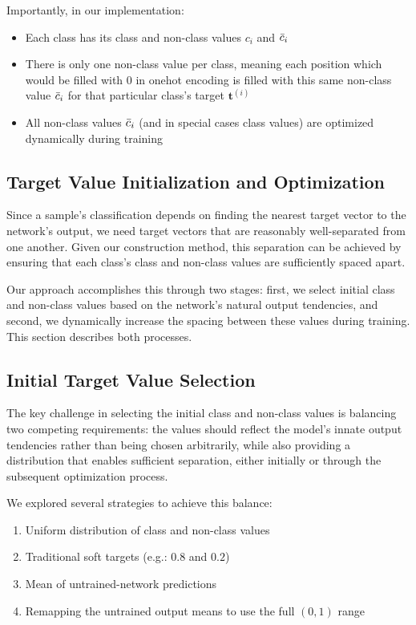 \documentclass[12pt,fleqn,a4paper]{article}
\begin{document}
Importantly, in our implementation:
\begin{itemize}
\item Each class has its class and non-class values $c_i$ and $\Bar{c}_i$
\item There is only one non-class value per class, meaning each position which would be filled with 0 in onehot encoding is filled with this same non-class value $\Bar{c}_i$ for that particular class's target $\mathbf{t}^{(i)}$

\item All non-class values $\Bar{c}_i$ (and in special cases class values) are optimized dynamically during training
\end{itemize}

\subsection{Target Value Initialization and Optimization}
Since a sample's classification depends on finding the nearest target vector to the network's output, we need target vectors that are reasonably well-separated from one another. Given our construction method, this separation can be achieved by ensuring that each class's class and non-class values are sufficiently spaced apart.

Our approach accomplishes this through two stages: first, we select initial class and non-class values based on the network's natural output tendencies, and second, we dynamically increase the spacing between these values during training. This section describes both processes.

\subsection{Initial Target Value Selection}
The key challenge in selecting the initial class and non-class values is balancing two competing requirements: the values should reflect the model's innate output tendencies rather than being chosen arbitrarily, while also providing a distribution that enables sufficient separation, either initially or through the subsequent optimization process.

We explored several strategies to achieve this balance:
\begin{enumerate}
    \item Uniform distribution of class and non-class values
    \item Traditional soft targets (e.g.: $0.8$ and $0.2$)
    \item Mean of untrained-network predictions
    \item Remapping the untrained output means to use the full $(0,1)$ range
\end{enumerate}
\end{document}
